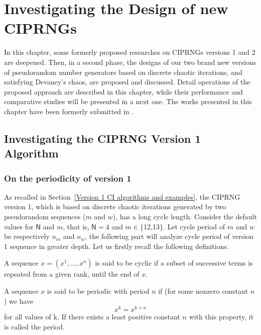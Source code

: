 \chapter{Investigating the Design of new CIPRNGs}
\label{CI dev}
\minitoc

In this chapter, some formerly proposed researches on CIPRNGs versions 1 and 2 are deepened. Then, in a second phase, the designs of our two brand new versions of pseudorandom number generators based on discrete chaotic iterations, and satisfying Devaney's chaos, are proposed and discussed. Detail operations of the proposed approach are described in this chapter, while their performance and  comparative studies will be presented in a next one. The works presented in this chapter have been formerly submitted in \cite{submit1, submit2, submit3}.



\section{Investigating the CIPRNG Version 1 Algorithm}

\subsection{On the periodicity of version 1}
\label{Conclusions and Future Work}
\label{Experiments and statistical tests}


As recalled in Section~\ref{Version 1 CI algorithms and examples}, the CIPRNG version 1, which is based on discrete chaotic iterations generated by two pseudorandom sequences ($m$ and $w$), has a long cycle length. Consider the default values for $\mathsf{N}$ and $m$, that is, $\mathsf{N}=4$ and $m \in \{$12,13$\}$. Let cycle period of $m$ and $w$ be respectively $n_m$ and $n_w$, the following part will analyze cycle period of version 1 sequence in greater depth.
Let us firstly recall the following definitions.
\begin{definition}%
A sequence $x = (x^{ 1} , ..., x^{n} )$ is said to be cyclic if a subset of successive terms is repeated from a given rank, until the end of $x$.
\end{definition}

\begin{definition}%
A sequence $x$ is said to be periodic with period $n$ if (for some nonzero constant $n$) we have
$$x^{k}=x^{k+n}$$
for all values of k. If there exists a least positive constant $n$ with this property, it is called the period. 
\label{period1}
\end{definition}

